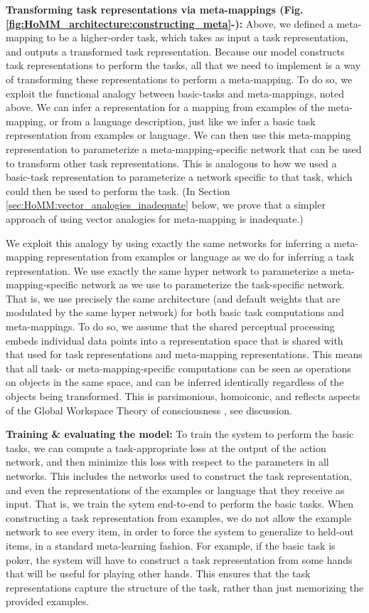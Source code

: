 \textbf{Transforming task representations via meta-mappings (Fig. \ref{fig:HoMM_architecture:constructing_meta}-):} Above, we defined a meta-mapping to be a higher-order task, which takes as input a task representation, and outputs a transformed task representation. Because our model constructs task representations to perform the tasks, all that we need to implement is a way of transforming these representations to perform a meta-mapping. To do so, we exploit the functional analogy between basic-tasks and meta-mappings, noted above. We can infer a representation for a mapping from examples of the meta-mapping, or from a language description, just like we infer a basic task representation from examples or language. We can then use this meta-mapping representation to parameterize a meta-mapping-specific network that can be used to transform other task representations. This is analogous to how we used a basic-task representation to parameterize a network specific to that task, which could then be used to perform the task. (In Section \ref{sec:HoMM:vector_analogies_inadequate} below, we prove that a simpler approach of using vector analogies for meta-mapping is inadequate.) 

We exploit this analogy by using exactly the same networks for inferring a meta-mapping representation from examples or language as we do for inferring a task representation. We use exactly the same hyper network to parameterize a meta-mapping-specific network as we use to parameterize the task-specific network. That is, we use precisely the same architecture (and default weights that are modulated by the same hyper network) for both basic task computations and meta-mappings. To do so, we assume that the shared perceptual processing embeds individual data points into a representation space that is shared with that used for task representations and meta-mapping representations. This means that all task- or meta-mapping-specific computations can be seen as operations on objects in the same space, and can be inferred identically regardless of the objects being transformed. This is parsimonious, homoiconic, and reflects aspects of the Global Workspace Theory of consciousness \citep{Baars2005}, see discussion.   

\textbf{Training \& evaluating the model:} To train the system to perform the basic tasks, we can compute a task-appropriate loss at the output of the action network, and then minimize this loss with respect to the parameters in all networks. This includes the networks used to construct the task representation, and even the representations of the examples or language that they receive as input. That is, we train the sytem end-to-end to perform the basic tasks. When constructing a task representation from examples, we do not allow the example network to see every item, in order to force the system to generalize to held-out items, in a standard meta-learning fashion. For example, if the basic task is poker, the system will have to construct a task representation from some hands that will be useful for playing other hands. This ensures that the task representations capture the structure of the task, rather than just memorizing the provided examples. 

